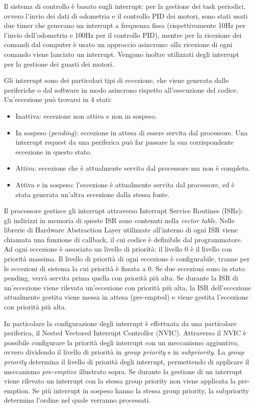 Il sistema di controllo è basato sugli interrupt: per la gestione dei task periodici, ovvero l'invio dei dati di odometria e il controllo PID dei motori, sono stati usati due timer che generano un interrupt a frequenza fissa (rispettivamente 10Hz per l'invio dell'odometria e 100Hz per il controllo PID), mentre per la ricezione dei comandi dal computer è usato un approccio asincrono: alla ricezione di ogni comando viene lanciato un interrupt. Vengono inoltre utilizzati degli interrupt per la gestione dei guasti dei motori.

Gli interrupt sono dei particolari tipi di eccezione, che viene generata dalle periferiche o dal software in modo asincrono rispetto all'esecuzione del codice.
Un'eccezione può trovarsi in 4 stati:
\begin{itemize}
    \item Inattiva: eccezione non attiva e non in sospeso.
    \item In sospeso (\textit{pending}): eccezione in attesa di essere servita dal processore. Una interrupt request da una periferica può far passare la sua corrispondente eccezione in questo stato. 
    \item Attiva: eccezione che è attualmente servita dal processore ma non è completa.
    \item Attiva e in sospeso: l'eccezione è attualmente servita dal processore, ed è stata generata un'altra eccezione dalla stessa fonte. 
\end{itemize}
Il processore gestisce gli interrupt attraverso Interrupt Service Routines (ISRs): gli indirizzi in memoria di queste ISR sono contenuti nella \textit{vector table}. Nelle librerie di Hardware Abstraction Layer utilizzate all'interno di ogni ISR viene chiamata una funzione di callback, il cui codice è definibile dal programmatore.
Ad ogni eccezione è associato un livello di priorità: il livello 0 è il livello con priorità massima. Il livello di priorità di ogni eccezione è configurabile, tranne per le eccezioni di sistema la cui priorità è fissata a 0.
Se due eccezioni sono in stato pending, verrà servita prima quella con priorità più alta.
Se durante la ISR di un'eccezione viene rilevata un'eccezione con priorità più alta, la ISR dell'eccezione attualmente gestita viene messa in attesa (pre-empted) e viene gestita l'eccezione con priorità più alta.

In particolare la configurazione degli interrupt è effettuata da una particolare periferica, il Nested Vectored Interrupt Controller (NVIC). Attraverso il NVIC è possibile configurare la priorità degli interrupt con un meccanismo aggiuntivo, ovvero dividendo il livello di priorità in \textit{group priority} e in \textit{subpriority}. 
La \textit{group priority} determina il livello di priorità degli interrupt, permettendo di applicare il meccanismo \textit{pre-emptive} illustrato sopra. Se durante la gestione di un interrupt viene rilevato un interrupt con la stessa group priority non viene applicata la pre-emption.
Se più interrupt in sospeso hanno la stessa group priority, la subpriority determina l'ordine nel quale verranno processati.

